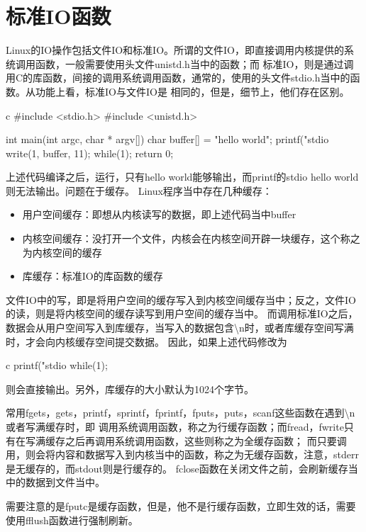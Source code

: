\section{标准IO函数}
Linux的IO操作包括文件IO和标准IO。所谓的文件IO，即直接调用内核提供的系统调用函数，一般需要使用头文件unistd.h当中的函数；而
标准IO，则是通过调用C的库函数，间接的调用系统调用函数，通常的，使用的头文件stdio.h当中的函数。从功能上看，标准IO与文件IO是
相同的，但是，细节上，他们存在区别。
\begin{code-block}{c}
#include <stdio.h>
#include <unistd.h>

int main(int argc, char * argv[])
{
        char  buffer[] = "hello world";
        printf("stdio %
        write(1, buffer, 11);
        while(1);
        return 0;
}
\end{code-block}

上述代码编译之后，运行，只有hello world能够输出，而printf的stdio hello world则无法输出。问题在于缓存。
Linux程序当中存在几种缓存：
\begin{itemize}
  \item 用户空间缓存：即想从内核读写的数据，即上述代码当中buffer
  \item 内核空间缓存：没打开一个文件，内核会在内核空间开辟一块缓存，这个称之为内核空间的缓存
  \item 库缓存：标准IO的库函数的缓存
\end{itemize}

文件IO中的写，即是将用户空间的缓存写入到内核空间缓存当中；反之，文件IO的读，则是将内核空间的缓存读写到用户空间的缓存当中。
而调用标准IO之后，数据会从用户空间写入到库缓存，当写入的数据包含\textbackslash n时，或者库缓存空间写满时，才会向内核缓存空间提交数据。
因此，如果上述代码修改为
\begin{code-block}{c}
printf("stdio %
while(1);
\end{code-block}
则会直接输出。另外，库缓存的大小默认为1024个字节。

常用fgets，gets，printf，sprintf，fprintf，fputs，puts，scanf这些函数在遇到\textbackslash n或者写满缓存时，即
调用系统调用函数，称之为行缓存函数；而fread，fwrite只有在写满缓存之后再调用系统调用函数，这些则称之为全缓存函数；
而只要调用，则会将内容和数据写入到内核当中的函数，称之为无缓存函数，注意，stderr是无缓存的，而stdout则是行缓存的。
fclose函数在关闭文件之前，会刷新缓存当中的数据到文件当中。

需要注意的是fputc是缓存函数，但是，他不是行缓存函数，立即生效的话，需要使用fflush函数进行强制刷新。

